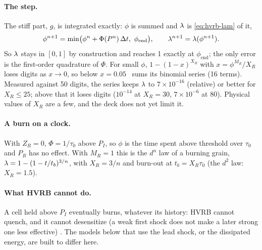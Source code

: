 \paragraph{The step.} The stiff part, $g$, is integrated exactly: $\phi$ is
summed and $\lambda$ is \cref{eq:hvrb-lam} of it,
\begin{equation}
  \phi^{n+1} = \min\bigl(\phi^n + \Phi(P^n)\,\Delta t,\ \phi_{\mathrm{end}}\bigr),
  \qquad \lambda^{n+1} = \lambda(\phi^{n+1}).
  \label{eq:hvrb-step}
\end{equation}
So $\lambda$ stays in $[0, 1]$ by construction and reaches 1 exactly at
$\phi_{\mathrm{end}}$; the only error is the first-order quadrature of
$\Phi$. For small $\phi$, $1 - (1 - x)^{X_R}$ with $x = \phi^{M_R}/X_R$ loses
digits as $x \to 0$, so below $x = 0.05$ \bw\ sums its binomial series (16
terms). Measured against 50 digits, the series keeps $\lambda$ to $7\times
10^{-16}$ (relative) or better for $X_R \le 25$; above that it loses digits
($10^{-14}$ at $X_R = 30$, $7\times 10^{-6}$ at 80). Physical values of $X_R$
are a few, and the deck does not yet limit it.

\paragraph{A burn on a clock.} With $Z_R = 0$, $\Phi = 1/\tau_0$ above
$P_I$, so $\phi$ is the time spent above threshold over $\tau_0$ and
$P_R$ has no effect. With $M_R = 1$ this is the $d^n$ law of a burning
grain, $\lambda = 1 - (1 - t/t_b)^{3/n}$, with $X_R = 3/n$ and burn-out at
$t_b = X_R\tau_0$ (the $d^2$ law: $X_R = 1.5$).

\paragraph{What HVRB cannot do.} A cell held above $P_I$ eventually burns,
whatever its history: HVRB cannot quench, and it cannot desensitize (a weak
first shock does not make a later strong one less effective)
\cite{tuttle2018}. The models below that use the lead shock, or the
dissipated energy, are built to differ here.


